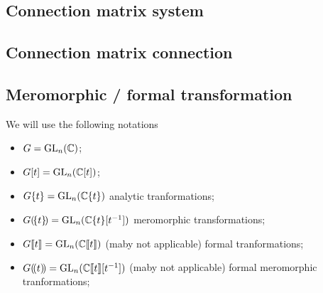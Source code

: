 \subsection{Connection matrix \leftrightarrow{} system}
\subsection{Connection matrix \rightarrow{} connection}
\begin{comment}
  There is a thm in \cite{sabbah2007isomonodromic}
\end{comment}

\subsection{Meromorphic / formal transformation}
\begin{comment}\footnotesize
  see \cite{thboalch} \textbf{Rem 1.41 on p. 16}:
  \begin{rem}
    Note that in most of the recent references we have used, Stokes matrices
    are used to classify
    \begin{itemize}
      \item meromorphic connections within fixed \textbf{formal meromorphic
        classes, modulo meromorphic equivalence}.
    \end{itemize}
    Whereas here we classify
    \begin{itemize}
      \item meromorphic connections within fixed \textbf{formal analytic
        classes, modulo analytic equivalence},
    \end{itemize}
    as is done in the older literature.  The fact is that the sets equivalence
    classes are the same in both cases. It is important for us to work with
    analytic, rather than meromorphic gauge transformations, because then the
    $\C^\infty$ viewpoint in Chapter 3 is cleaner. This distinction relates to
    the difference between \textbf{‘regular singular’} connections and
    \textbf{‘logarithmic’} connections.
  \end{rem}
\end{comment}
\begin{notations}
  We will use the following notations
  \begin{itemize}
    \item $G=\operatorname{GL}_n(\mathbb{C})$;
    \item $G[t]=\operatorname{GL}_n(\mathbb{C}[t])$;
    \item $G\{t\}=\operatorname{GL}_n(\mathbb{C}\{t\})$ analytic tranformations;
    \item $G(\!\{t\}\!)=\operatorname{GL}_n(\mathbb{C}\{t\}[t^{-1}])$ meromorphic transformations;
    \item $G\llbracket t\rrbracket=\operatorname{GL}_n(\mathbb{C}\llbracket t\rrbracket)$
      (maby not applicable) formal tranformations;
    \item $G(\!(t)\!)=\operatorname{GL}_n(\mathbb{C}\llbracket t\rrbracket[t^{-1}])$
      (maby not applicable) formal meromorphic tranformations;
  \end{itemize}
\end{notations}
